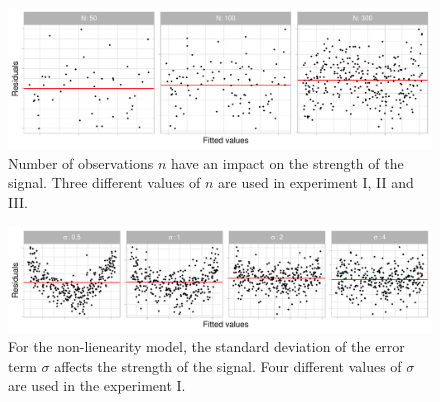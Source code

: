 \documentclass[]{interact}
\theoremstyle{plain}%
\theoremstyle{definition}
\theoremstyle{remark}
\begin{document}
\begin{figure}

{\centering \includegraphics[width=1\linewidth]{paper_comparison_files/figure-latex/different-n-1} 

}

\caption{Number of observations $n$ have an impact on the strength of the signal. Three different values of $n$ are used in experiment I, II and III.}\label{fig:different-n}
\end{figure}

\begin{figure}

{\centering \includegraphics[width=1\linewidth]{paper_comparison_files/figure-latex/different-sigma-1} 

}

\caption{For the non-lienearity model, the standard deviation of the error term $\sigma$ affects the strength of the signal. Four different values of $\sigma$ are used in the experiment I.}\label{fig:different-sigma}
\end{figure}
\end{document}
